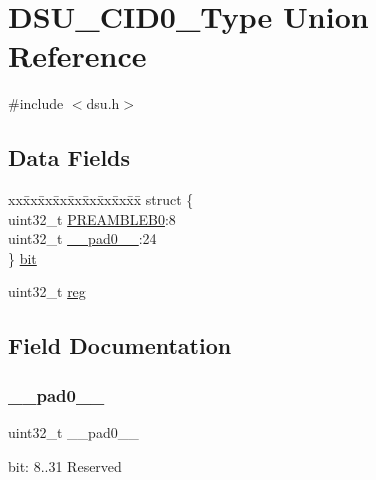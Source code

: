 \hypertarget{union_d_s_u___c_i_d0___type}{}\section{D\+S\+U\+\_\+\+C\+I\+D0\+\_\+\+Type Union Reference}
\label{union_d_s_u___c_i_d0___type}


{\ttfamily \#include $<$dsu.\+h$>$}

\subsection*{Data Fields}
\begin{DoxyCompactItemize}
\item 
\begin{tabbing}
xx\=xx\=xx\=xx\=xx\=xx\=xx\=xx\=xx\=\kill
struct \{\\
\>uint32\_t \mbox{\hyperlink{union_d_s_u___c_i_d0___type_aa8dbe5bb6810d255b60e74eb37ea6e07}{PREAMBLEB0}}:8\\
\>uint32\_t \mbox{\hyperlink{union_d_s_u___c_i_d0___type_a3e57c2ef1c3ffb36722f000cc1156824}{\_\_pad0\_\_}}:24\\
\} \mbox{\hyperlink{union_d_s_u___c_i_d0___type_a2c0a829d937f4df1c5e2380fcb0a2cbe}{bit}}\\

\end{tabbing}\item 
uint32\+\_\+t \mbox{\hyperlink{union_d_s_u___c_i_d0___type_a6b91636401516a477989a336376d7b40}{reg}}
\end{DoxyCompactItemize}


\subsection{Field Documentation}
\mbox{\label{union_d_s_u___c_i_d0___type_a3e57c2ef1c3ffb36722f000cc1156824}} 
\subsubsection{\texorpdfstring{\_\_pad0\_\_}{\_\_pad0\_\_}}
{\footnotesize\ttfamily uint32\+\_\+t \+\_\+\+\_\+pad0\+\_\+\+\_\+}

bit\+: 8..31 Reserved \mbox{\label{union_d_s_u___c_i_d0___type_a2c0a829d937f4df1c5e2380fcb0a2cbe}} 
